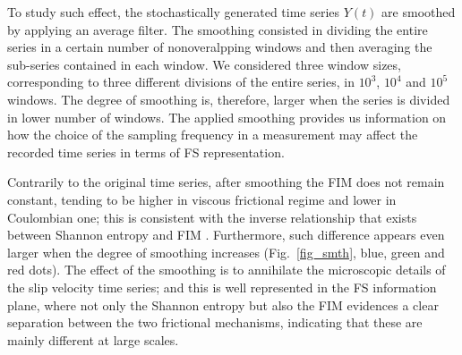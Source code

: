 \documentclass[%
 aip,
rsi,%
 amsmath,amssymb,
 reprint,%
]{revtex4-1}
\begin{document}
To study such effect, the stochastically generated time series $Y(t)$ are smoothed by applying an average filter. The smoothing consisted in dividing the entire series in a certain number of nonoveralpping windows and then averaging the sub-series contained in each window. We considered three window sizes, corresponding to three different divisions of the entire series, in $10^3$, $10^4$ and $10^5$ windows. The degree of smoothing is, therefore, larger when the series is divided in lower number of windows. The applied smoothing provides us information on how the choice of the sampling frequency in a measurement may affect the recorded time series in terms of FS representation.

Contrarily to the original time series, after smoothing the FIM does not remain constant, tending to be  higher in viscous frictional regime and lower in Coulombian one; this is consistent with the inverse relationship that exists between Shannon entropy and FIM \cite{vignat_analysis_2003}. Furthermore, such difference appears even larger when the degree of smoothing increases (Fig.~\ref{fig_smth}, blue, green and red dots).
The effect of the smoothing is to annihilate the microscopic details of the slip velocity time series; and this is well represented in the FS information plane, where not only the Shannon entropy but also the FIM evidences a clear separation between the two frictional mechanisms, indicating that these are mainly different at large scales.

\end{document}
